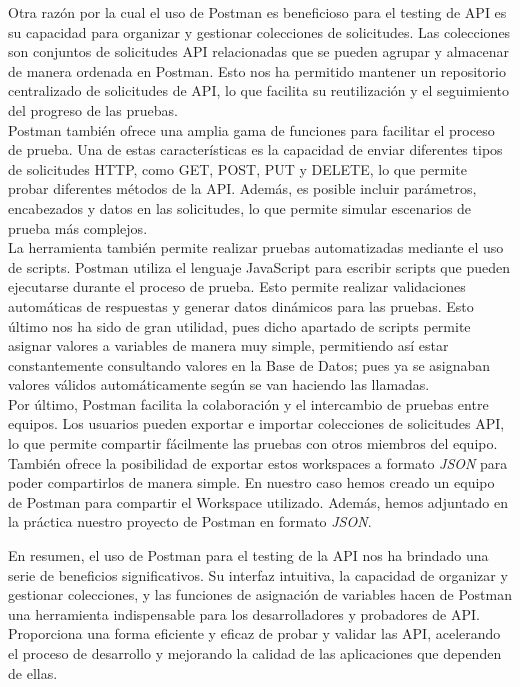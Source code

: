 \documentclass[12pt]{report}
\begin{document}
Otra razón por la cual el uso de Postman es beneficioso para el testing de API es su capacidad para organizar y gestionar colecciones de solicitudes. Las colecciones son conjuntos de solicitudes API relacionadas que se pueden agrupar y almacenar de manera ordenada en Postman. Esto nos ha permitido mantener un repositorio centralizado de solicitudes de API, lo que facilita su reutilización y el seguimiento del progreso de las pruebas.\\

Postman también ofrece una amplia gama de funciones para facilitar el proceso de prueba. Una de estas características es la capacidad de enviar diferentes tipos de solicitudes HTTP, como GET, POST, PUT y DELETE, lo que permite probar diferentes métodos de la API. Además, es posible incluir parámetros, encabezados y datos en las solicitudes, lo que permite simular escenarios de prueba más complejos.\\

La herramienta también permite realizar pruebas automatizadas mediante el uso de scripts. Postman utiliza el lenguaje JavaScript para escribir scripts que pueden ejecutarse durante el proceso de prueba. Esto permite realizar validaciones automáticas de respuestas y generar datos dinámicos para las pruebas. Esto último nos ha sido de gran utilidad, pues dicho apartado de scripts permite asignar valores a variables de manera muy simple, permitiendo así estar constantemente consultando valores en la Base de Datos; pues ya se asignaban valores válidos automáticamente según se van haciendo las llamadas.\\

Por último, Postman facilita la colaboración y el intercambio de pruebas entre equipos. Los usuarios pueden exportar e importar colecciones de solicitudes API, lo que permite compartir fácilmente las pruebas con otros miembros del equipo. También ofrece la posibilidad de exportar estos workspaces a formato \textit{JSON} para poder compartirlos de manera simple. En nuestro caso hemos creado un equipo de Postman para compartir el Workspace utilizado. Además, hemos adjuntado en la práctica nuestro proyecto de Postman en formato \textit{JSON}.

En resumen, el uso de Postman para el testing de la API nos ha brindado una serie de beneficios significativos. Su interfaz intuitiva, la capacidad de organizar y gestionar colecciones, y las funciones de asignación de variables hacen de Postman una herramienta indispensable para los desarrolladores y probadores de API. Proporciona una forma eficiente y eficaz de probar y validar las API, acelerando el proceso de desarrollo y mejorando la calidad de las aplicaciones que dependen de ellas.
\end{document}
